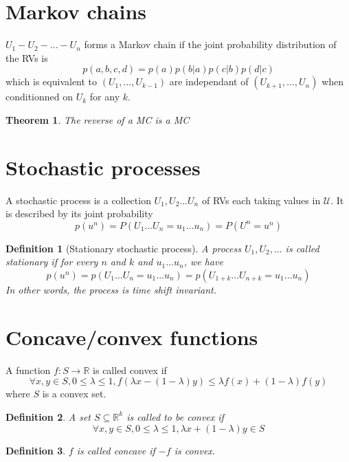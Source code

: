 \documentclass{article}
\newtheorem{theorem}{Theorem}[section]
\newtheorem{definition}{Definition}[section]
\theoremstyle{definition} %
\def\U{\mathcal{U}}
\def\R{\mathbb{R}}
\begin{document}
\newpage
\begin{appendices}
\section{Markov chains}
\label{appendix:markov-chains}

$U_1 - U_2 - \dots - U_n$ forms a Markov chain if the joint probability
distribution of the RVs is
\[
  p(a,b,c,d) = p(a)p(b|a)p(c|b)p(d|c)
\]
which is equivalent to $(U_1, \dots, U_{k-1})$ are independant of $(U_{k+1}, \dots, U_n)$ when conditionned on $U_k$ for any $k$.


\begin{theorem}
  The reverse of a MC is a MC
\end{theorem}


\section{Stochastic processes}
\label{appendix:stoch-proc}

A stochastic process is a collection $U_1, U_2 \dots U_n$ of RVs each taking values in $\U$. It is described by its joint probability
\[
  p(u^n) = P(U_1 \dots U_n = u_1 \dots u_n) = P(U^n = u^n)
\]

\begin{definition}[Stationary stochastic process]
  A process $U_1, U_2, \dots$ is called stationary if for every $n$ and $k$ and $u_1 \dots u_n$, we have
  \[
    p(u^n) = p(U_1 \dots U_n = u_1 \dots u_n) = p(U_{1+k} \dots U_{n+k} = u_1 \dots u_n)
  \]
  In other words, the process is time shift invariant.
\end{definition}

\section{Concave/convex functions}
\label{sec:appendix-convex}

A function $f : S \rightarrow \R $ is called convex if
\[ \forall x,y \in S, 0 \leq \lambda \leq 1,  f(\lambda x - (1 - \lambda)y) \leq \lambda f(x) + (1 - \lambda) f(y) \]
where $S$ is a convex set.

\begin{definition}
  A set $S \subseteq \R^k$ is called to be convex if
  \[ \forall x,y \in S, 0 \leq \lambda \leq 1,  \lambda x + (1 - \lambda) y \in S\]
\end{definition}

\begin{definition}
  $f$ is called concave if $-f$ is convex.
\end{definition}


\end{appendices}
\end{document}
